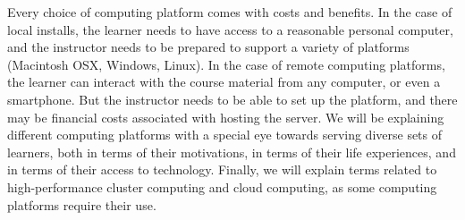 
Every choice of computing platform comes with costs and benefits. 
In the case of local installs, the learner needs to have access to a reasonable personal computer, and the instructor needs to be prepared to support a variety of platforms (Macintosh OSX, Windows, Linux). 
In the case of remote computing platforms, the learner can interact with the course material from any computer, or even a smartphone.
But the instructor needs to be able to set up the platform, and there may be financial costs associated with hosting the server.
We will be explaining different computing platforms with a special eye towards serving diverse sets of learners, both in terms of their motivations, in terms of their life experiences, and in terms of their access to technology.
Finally, we will explain terms related to high-performance cluster computing and cloud computing, as some computing platforms require their use.


